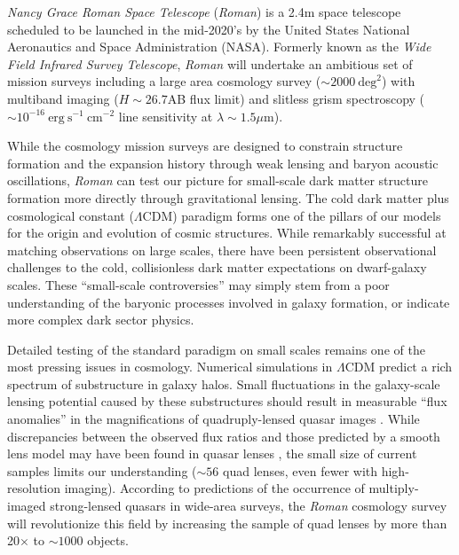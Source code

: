 \documentclass[11pt]{article}
\newcommand{\RST}{\emph{Roman}\xspace}
\begin{document}
\clearpage

\noindent %

\emph{Nancy Grace Roman Space Telescope} (\RST) is a 2.4m space telescope scheduled 
to be launched in the
mid-2020's by the United States National Aeronautics and Space Administration (NASA)\citep{spergel2015a,akeson2019a}.
Formerly known as the \emph{Wide Field Infrared Survey Telescope}, \RST will undertake
an ambitious set of mission surveys including a large area cosmology survey ($\sim 2000~\mathrm{deg}^2$)
with multiband imaging ($H\sim26.7$AB flux limit) and slitless grism spectroscopy ($\sim10^{-16}~\mathrm{erg}~\mathrm{s}^{-1}~\mathrm{cm}^{-2}$ line sensitivity at $\lambda\sim1.5\mu$m).

While the cosmology mission surveys are designed to constrain structure formation and the
expansion history through weak lensing and baryon acoustic oscillations, 
\RST can test our picture for small-scale dark matter structure formation more
directly through gravitational lensing. The cold dark matter plus cosmological constant ($\Lambda$CDM)
paradigm forms one of the pillars of our models for the origin and evolution of cosmic structures.
While remarkably successful at matching observations on large scales, there have been persistent
observational challenges to the cold, collisionless dark matter expectations on dwarf-galaxy
scales. These “small-scale controversies” may simply stem from a poor understanding of the
baryonic processes involved in galaxy formation, or indicate more complex dark sector physics\citep{bullock2017a}.

Detailed testing of the standard paradigm on small scales remains one of the most pressing issues
in cosmology. Numerical simulations in $\Lambda$CDM predict a rich spectrum of substructure in galaxy
halos. Small fluctuations in the galaxy-scale lensing potential caused by these substructures
should result in measurable “flux anomalies” in the magnifications of quadruply-lensed quasar
images \citep{metcalf2001a}. While discrepancies between the observed flux ratios and
those predicted by a smooth lens model may have been found in quasar lenses \citep{mao1998a,dalal2002a,metcalf2002a}, the small size of current samples limits our understanding ($\sim56$
quad lenses\citep{lemon2020a}, even fewer with high-resolution imaging). According to predictions of the
occurrence of multiply-imaged strong-lensed quasars in wide-area surveys\citep{oguri2010a},
the \RST cosmology
survey will revolutionize this field
by increasing the sample of quad lenses by more than 20$\times$ to $\sim1000$ objects.
\end{document}
